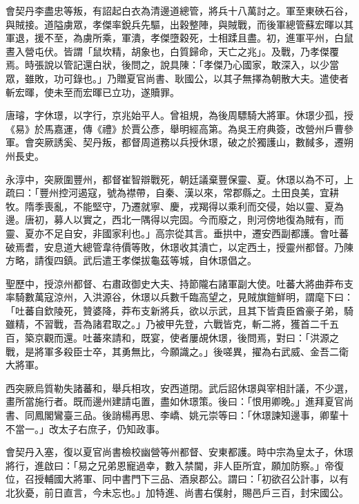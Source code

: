 \begin{pinyinscope}
 會契丹李盡忠等叛，有詔起白衣為清邊道總管，將兵十八萬討之。軍至東硤石谷，與賊接。道隘虜眾，孝傑率銳兵先驅，出穀整陣，與賊戰，而後軍總管蘇宏暉以其軍退，援不至，為虜所乘，軍潰，孝傑墮穀死，士相蹂且盡。初，進軍平州，白鼠晝入營屯伏。皆謂「鼠坎精，胡象也，白質歸命，天亡之兆」。及戰，乃孝傑覆焉。時張說以管記還白狀，後問之，說具陳：「孝傑乃心國家，敢深入，以少當眾，雖敗，功可錄也。」乃贈夏官尚書、耿國公，以其子無擇為朝散大夫。遣使者斬宏暉，使未至而宏暉已立功，遂贖罪。



 唐璿，字休璟，以字行，京兆始平人。曾祖規，為後周驃騎大將軍。休璟少孤，授《易》於馬嘉運，傳《禮》於賈公彥，舉明經高第。為吳王府典簽，改營州戶曹參軍。會突厥誘奚、契丹叛，都督周道務以兵授休璟，破之於獨護山，數馘多，遷朔州長史。



 永淳中，突厥圍豐州，都督崔智辯戰死，朝廷議棄豐保靈、夏。休璟以為不可，上疏曰：「豐州控河遏寇，號為襟帶，自秦、漢以來，常郡縣之。土田良美，宜耕牧。隋季喪亂，不能堅守，乃遷就寧、慶，戎羯得以乘利而交侵，始以靈、夏為邊。唐初，募人以實之，西北一隅得以完固。今而廢之，則河傍地復為賊有，而靈、夏亦不足自安，非國家利也。」高宗從其言。垂拱中，遷安西副都護。會吐蕃破焉耆，安息道大總管韋待價等敗，休璟收其潰亡，以定西土，授靈州都督。乃陳方略，請復四鎮。武后遣王孝傑拔龜茲等城，自休璟倡之。



 聖歷中，授涼州都督、右肅政御史大夫、持節隴右諸軍副大使。吐蕃大將曲莽布支率騎數萬寇涼州，入洪源谷，休璟以兵數千臨高望之，見賊旗鎧鮮明，謂麾下曰：「吐蕃自欽陵死，贊婆降，莽布支新將兵，欲以示武，且其下皆貴臣酋豪子弟，騎雖精，不習戰，吾為諸君取之。」乃被甲先登，六戰皆克，斬二將，獲首二千五百，築京觀而還。吐蕃來請和，既宴，使者屢覘休璟，後問焉，對曰：「洪源之戰，是將軍多殺臣士卒，其勇無比，今願識之。」後嗟異，擢為右武威、金吾二衛大將軍。



 西突厥烏質勒失諸蕃和，舉兵相攻，安西道閉。武后詔休璟與宰相計議，不少選，畫所當施行者。既而邊州建請屯置，盡如休璟策。後曰：「恨用卿晚。」進拜夏官尚書、同鳳閣鸞臺三品。後誚楊再思、李嶠、姚元崇等曰：「休璟諫知邊事，卿輩十不當一。」改太子右庶子，仍知政事。



 會契丹入塞，復以夏官尚書檢校幽營等州都督、安東都護。時中宗為皇太子，休璟將行，進啟曰：「易之兄弟恩寵過幸，數入禁閫，非人臣所宜，願加防察。」帝復位，召授輔國大將軍、同中書門下三品、酒泉郡公。謂曰：「初欲召公計事，以有北狄憂，前日直言，今未忘也。」加特進、尚書右僕射，賜邑戶三百，封宋國公。




\end{pinyinscope}
